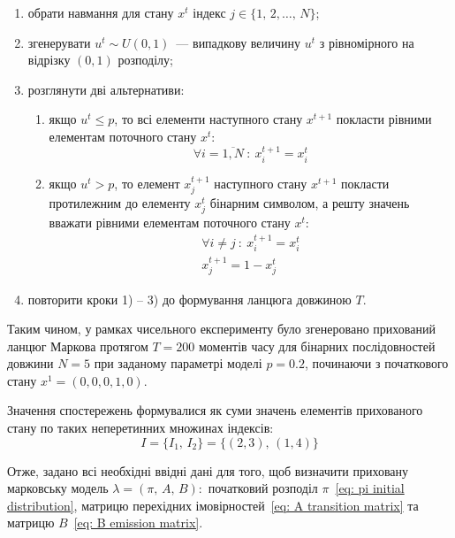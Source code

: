 \newpage
\begin{enumerate}
    \item обрати навмання для стану $x^t$ індекс $j \in \{ 1,\,2,\ldots,\,N \}$;
    \item згенерувати $u^t \sim U(0,1)$~--- випадкову величину $u^t$ з рівномірного на відрізку $(0,1)$ розподілу;
    \item розглянути дві альтернативи:
    \begin{enumerate} 
        \item якщо $u^t \leqslant p$, то всі елементи наступного стану $x^{t+1}$ покласти рівними елементам поточного стану $x^{t}:$
        \begin{equation*}
            \forall i=\overline{1,N}\ :\ x^{t+1}_i=x^{t}_i
        \end{equation*}
        \item якщо $u^t > p$, то елемент $x^{t+1}_j$ наступного стану $x^{t+1}$ покласти протилежним до елементу $x^{t}_j$ бінарним символом, а решту значень вважати рівними елементам поточного стану $x^{t}:$
        \begin{gather*}
            \forall i \neq j\ :\ x^{t+1}_i=x^{t}_i \\
            x^{t+1}_j=1 - x^{t}_j
        \end{gather*}
    \end{enumerate}
    \item повторити кроки 1) -- 3) до формування ланцюга довжиною $T$.
\end{enumerate}

Таким чином, у рамках чисельного експерименту було згенеровано прихований ланцюг Маркова протягом $T=200$ моментів часу для бінарних послідовностей довжини $N=5$ при заданому параметрі моделі $p=0.2$, починаючи з початкового стану $x^1=(0,0,0,1,0)$. 

Значення спостережень формувалися як суми значень елементів прихованого стану по таких неперетинних множинах індексів:
\begin{equation}\label{eq: example observed indexes}
    I=\{I_1,\,I_2\}=\{(2,3),\,(1,4)\}
\end{equation} 

Отже, задано всі необхідні ввідні дані для того, щоб визначити приховану марковську модель $\lambda=\left( \pi,\,A,\,B \right):$ початковий розподіл $\pi$~\eqref{eq: pi initial distribution}, матрицю перехідних імовірностей~\eqref{eq: A transition matrix} та матрицю $B$~\eqref{eq: B emission matrix}.


